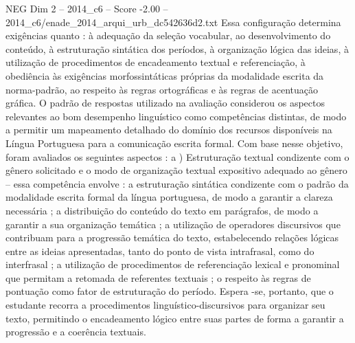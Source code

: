 \begin{textsample}{NEG Dim 2 – 2014\_c6 – Score -2.00 – 2014\_c6/enade\_2014\_arqui\_urb\_dc542636d2.txt}
Essa configuração determina exigências quanto : à adequação da seleção vocabular, ao desenvolvimento do conteúdo, à estruturação sintática dos períodos, à organização lógica das ideias, à utilização de procedimentos de encadeamento textual e referenciação, à obediência às exigências morfossintáticas próprias da modalidade escrita da norma-padrão, ao respeito às regras ortográficas e às regras de acentuação gráfica.
O padrão de respostas utilizado na avaliação considerou os aspectos relevantes ao bom desempenho linguístico como competências distintas, de modo a permitir um mapeamento detalhado do domínio dos recursos disponíveis na Língua Portuguesa para a comunicação escrita formal.
Com base nesse objetivo, foram avaliados os seguintes aspectos : a ) Estruturação textual condizente com o gênero solicitado e o modo de organização textual expositivo adequado ao gênero – essa competência envolve : a estruturação sintática condizente com o padrão da modalidade escrita formal da língua portuguesa, de modo a garantir a clareza necessária ; a distribuição do conteúdo do texto em parágrafos, de modo a garantir a sua organização temática ; a utilização de operadores discursivos que contribuam para a progressão temática do texto, estabelecendo relações lógicas entre as ideias apresentadas, tanto do ponto de vista intrafrasal, como do interfrasal ; a utilização de procedimentos de referenciação lexical e pronominal que permitam a retomada de referentes textuais ; o respeito às regras de pontuação como fator de estruturação do período.
Espera -se, portanto, que o estudante recorra a procedimentos linguístico-discursivos para organizar seu texto, permitindo o encadeamento lógico entre suas partes de forma a garantir a progressão e a coerência textuais.

\end{textsample}
